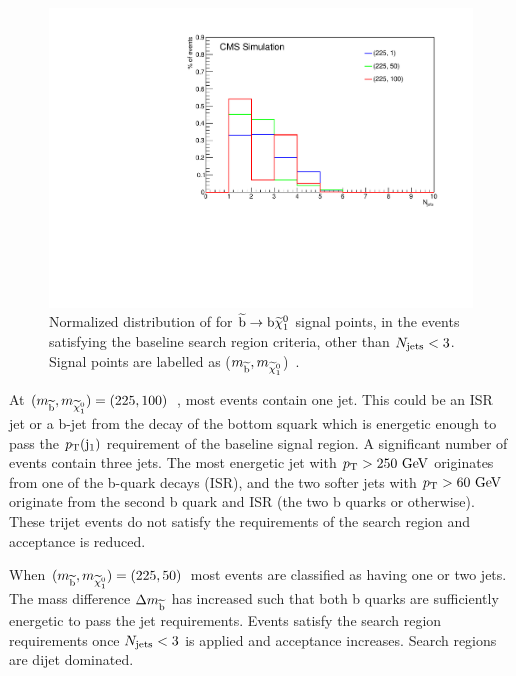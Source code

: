 \begin{figure}[!Hhtb]
  \begin{center}
  \includegraphics[scale=0.39]{Figures/sus13009/Njets_225_Norm.pdf}
  \caption{Normalized distribution of \njets for $\widetilde{{\rm b}} \rightarrow {\rm b} \widetilde{\chi}^{0}_{1}$ signal points, in the events satisfying the baseline search region criteria, other than $N_{\text{jets}}<3$. Signal points are labelled as ($m_{\widetilde{{\rm b}}}, m_{\widetilde{\chi}^{0}_{1}}$)~\GeV.}
  \label{fig:sbot225njets}
  \end{center}
\end{figure}

At $(m_{\widetilde{{\rm b}}},m_{\widetilde{\chi}^{0}_{1}}) = (225, 100)$~\GeV, most events contain one jet. 
This could be an \ac{ISR} jet or a b-jet from the decay of the bottom squark which is energetic enough to pass the $p_{\text{T}}({\rm j}_1)$ requirement of the baseline signal region.
A significant number of events contain three jets. 
The most energetic jet with $p_{\text{T}}>250~\mathrm{GeV}$ originates from one of the b-quark decays (\ac{ISR}), and the two softer jets with $p_{\text{T}}>60~\mathrm{GeV}$ originate from the second b quark and \ac{ISR} (the two b quarks or otherwise). 
These trijet events do not satisfy the requirements of the search region and acceptance is reduced. 

When $(m_{\widetilde{{\rm b}}},m_{\widetilde{\chi}^{0}_{1}}) = (225, 50)$~\GeV most events are classified as having one or two jets. 
The mass difference $\Delta m_{\widetilde{{\rm b}}}$ has increased such that both b quarks are sufficiently energetic to pass the jet requirements. 
Events satisfy the search region requirements once $N_{\text{jets}}<3$ is applied and acceptance increases. 
Search regions are dijet dominated. 

